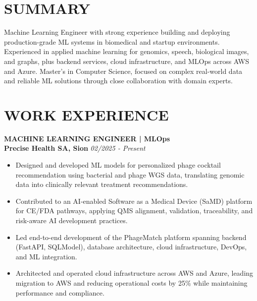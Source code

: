 \documentclass[9pt, letterpaper]{extarticle}
\begin{document}
\noindent
\begin{minipage}[t]{0.64\textwidth}
\raggedright


\section{SUMMARY}
\small
Machine Learning Engineer with strong experience building and deploying production-grade ML systems in biomedical and startup environments. Experienced in applied machine learning for genomics, speech, biological images, and graphs, plus backend services, cloud infrastructure, and MLOps across AWS and Azure. Master's in Computer Science, focused on complex real-world data and reliable ML solutions through close collaboration with domain experts.

\section{WORK EXPERIENCE}

\textbf{MACHINE LEARNING ENGINEER | MLOps} \\
\textbf{Precise Health SA, Sion} \hfill \textit{02/2025 - Present}
\small
\begin{itemize}
    \item Designed and developed ML models for personalized phage cocktail recommendation using bacterial and phage WGS data, translating genomic data into clinically relevant treatment recommendations.
    
    \item Contributed to an AI-enabled Software as a Medical Device (SaMD) platform for CE/FDA pathways, applying QMS alignment, validation, traceability, and risk-aware AI development practices.
    
    \item Led end-to-end development of the PhageMatch platform spanning backend (FastAPI, SQLModel), database architecture, cloud infrastructure, DevOps, and ML integration.
        
    \item Architected and operated cloud infrastructure across AWS and Azure, leading migration to AWS and reducing operational costs by 25\% while maintaining performance and compliance.
    

\end{itemize}
\end{minipage}
\end{document}
